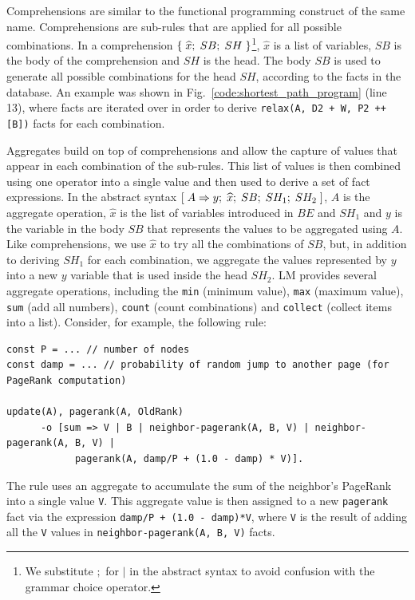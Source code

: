 Comprehensions are similar to the functional programming construct of the same
name.  Comprehensions are sub-rules that are applied for all possible
combinations. In a comprehension
$\{ \; \widehat{x}; \; SB; \; SH \; \}$\footnote{We substitute $;$ for $|$ in the
abstract syntax to avoid confusion with the grammar choice operator.},
$\widehat{x}$ is a list of variables, $SB$ is the body of the comprehension and
$SH$ is the head. The body $SB$ is used to generate all possible combinations
for the head $SH$, according to the facts in the database.  An example was shown
in Fig.~\ref{code:shortest_path_program} (line 13), where  facts are iterated over in order to derive \texttt{relax(A, D2 + W, P2 ++
[B])} facts for each combination.

Aggregates build on top of comprehensions and allow the capture of values that
appear in each combination of the sub-rules. This list of values is then
combined using one operator into a single value and then used to derive a set of
fact expressions. In the abstract syntax
$[\; A \Rightarrow y; \; \widehat{x}; \; SB; \; SH_1; \; SH_2 \;]$, $A$ is the aggregate operation,
$\widehat{x}$ is the list of variables introduced in $BE$ and $SH_1$ and $y$ is
the variable in the body $SB$ that represents the values to be aggregated using
$A$. Like comprehensions, we use $\widehat{x}$ to try all the combinations of
$SB$, but, in addition to deriving $SH_1$ for each combination, we aggregate the
values represented by $y$ into a new $y$ variable that is used inside the head
$SH_2$.  LM provides several aggregate operations, including the \texttt{min}
(minimum value), \texttt{max} (maximum value), \texttt{sum} (add all numbers),
\texttt{count} (count combinations) and \texttt{collect} (collect items into a
list). Consider, for example, the following rule:

\begin{Verbatim}[fontsize=\scriptsize]
const P = ... // number of nodes
const damp = ... // probability of random jump to another page (for PageRank computation)

update(A), pagerank(A, OldRank)
      -o [sum => V | B | neighbor-pagerank(A, B, V) | neighbor-pagerank(A, B, V) |
            pagerank(A, damp/P + (1.0 - damp) * V)].
\end{Verbatim}

The rule uses an aggregate to accumulate the sum of the neighbor's PageRank into
a single value \texttt{V}. This aggregate value is then assigned to a new
\texttt{pagerank} fact via the expression \texttt{damp/P + (1.0 - damp)*V},
where \texttt{V} is the result of adding all the \texttt{V} values in
\texttt{neighbor-pagerank(A, B, V)} facts.
